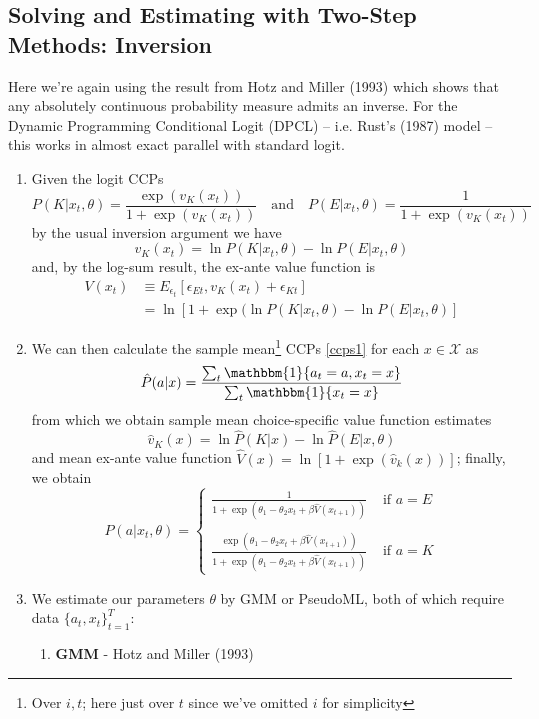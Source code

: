 \documentclass[11pt]{article}
\begin{document}
\subsection{Solving and Estimating with Two-Step Methods: Inversion}
		Here we're again using the result from Hotz and Miller (1993) which shows that any absolutely continuous probability measure admits an inverse. For the Dynamic Programming Conditional Logit (DPCL) -- i.e. Rust's (1987) model -- this works in almost exact parallel with standard logit.
  \begin{enumerate}
    \item Given the logit CCPs
		\begin{equation}\label{ccps1}
			P(K|x_t,\theta) = \frac{\exp{}(v_K(x_t))}{1+\exp{}(v_K(x_t))}\quad\text{and}\quad P(E|x_t,\theta) = \frac{1}{1+\exp{}(v_K(x_t))}
		\end{equation}
    by the usual inversion argument we have
		\begin{equation}
		v_K(x_t)= \ln P(K|x_t,\theta) - \ln P(E|x_t,\theta)
		\end{equation}
		and, by the log-sum result, the ex-ante value function is
		\begin{equation}
		\begin{split}
		V(x_t) & \equiv E_{\epsilon_t}[\epsilon_{Et}, v_K(x_t)+\epsilon_{Kt}] \\
		& = \ln [1 + \exp (\ln P(K|x_t, \theta) - \ln P(E|x_t, \theta)]
		\end{split}
		\end{equation}
		\item We can then calculate the sample mean\footnote{Over $i,t$; here just over $t$ since we've omitted $i$ for simplicity} CCPs \eqref{ccps1} for each $x\in \mathcal{X}$ as
		\begin{equation}
      \label{nonpccp}
		\hat{P}(a|x) = \frac{\sum_t \mathbbm{1}\{a_{t}=a, x_{t}=x\}}{\sum_t \mathbbm{1}\{x_{t}=x\}}
		\end{equation}
		from which we obtain sample mean choice-specific value function estimates
		\begin{equation}
      \label{vhat}
		\hat{v}_K(x) = \ln \hat{P}(K|x) - \ln \hat{P}(E|x,\theta)
		\end{equation}
		and mean ex-ante value function $\hat{V}(x)=\ln [1+\exp (\hat{v}_k(x))]$; finally, we obtain
		\begin{equation}
      \label{hmccp}
			P(a|x_t,\theta)=
			\begin{cases}
			\frac{1}{1 + \exp (\theta_1 - \theta_2 x_t + \beta \hat{V}(x_{t+1}))} & \text{ if } a=E \\
			&\\
			\frac{\exp (\theta_1 - \theta_2 x_t + \beta \hat{V}(x_{t+1}))}{1 + \exp (\theta_1 - \theta_2 x_t + \beta \hat{V}(x_{t+1}))} & \text{ if } a=K
			\end{cases}
		\end{equation}
		\item We estimate our parameters $\theta$ by GMM or PseudoML, both of which require data $\{a_t, x_t\}_{t=1}^T$:
\begin{enumerate}
\item \textbf{GMM} - Hotz and Miller (1993)


\end{enumerate}
\end{enumerate}
\end{document}
